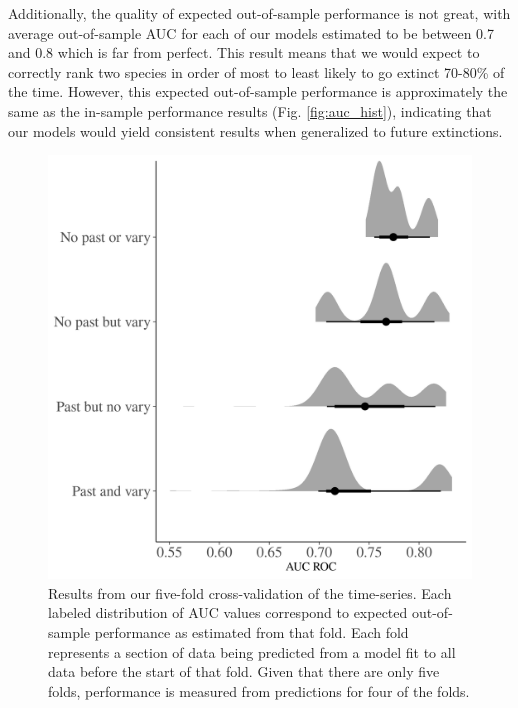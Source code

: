 \documentclass[12pt,letterpaper]{article}
\begin{document}
Additionally, the quality of expected out-of-sample performance is not great, with average out-of-sample AUC for each of our models estimated to be between 0.7 and 0.8 which is far from perfect. This result means that we would expect to correctly rank two species in order of most to least likely to go extinct 70-80\% of the time. However, this expected out-of-sample performance is approximately the same as the in-sample performance results (Fig. \ref{fig:auc_hist}), indicating that our models would yield consistent results when generalized to future extinctions.
\begin{figure}[ht]
  \centering
  \includegraphics[width=\textwidth,height=0.5\textheight,keepaspectratio=true]{../results/figure/fold_auc}
  \caption{Results from our five-fold cross-validation of the time-series. Each labeled distribution of AUC values correspond to expected out-of-sample performance as estimated from that fold. Each fold represents a section of data being predicted from a model fit to all data before the start of that fold. Given that there are only five folds, performance is measured from predictions for four of the folds.}
  \label{fig:fold_auc}
\end{figure}
\end{document}
